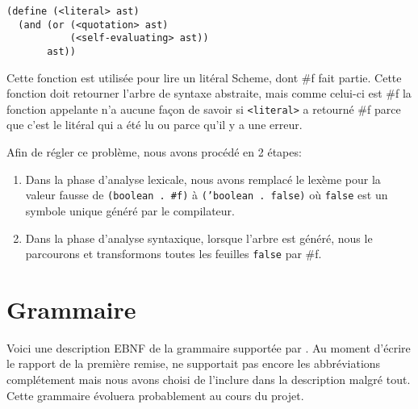\documentclass[11pt]{report}
\begin{document}
\begin{verbatim}
(define (<literal> ast)
  (and (or (<quotation> ast)
           (<self-evaluating> ast))
       ast))
\end{verbatim}

Cette fonction est utilisée pour lire un litéral Scheme, dont \#f fait
partie.  Cette fonction doit retourner l'arbre de syntaxe abstraite,
mais comme celui-ci est \#f la fonction appelante n'a aucune façon de
savoir si {\tt <literal>} a retourné \#f parce que c'est le litéral
qui a été lu ou parce qu'il y a une erreur.

Afin de régler ce problème, nous avons procédé en 2 étapes:

\begin{enumerate}
\item Dans la phase d'analyse lexicale, nous avons remplacé le lexème
  pour la valeur fausse de {\tt (boolean . #f)} à {\tt ('boolean .
    false)} où {\tt false} est un symbole unique généré par le
  compilateur.
\item Dans la phase d'analyse syntaxique, lorsque l'arbre est généré,
  nous le parcourons et transformons toutes les feuilles {\tt false}
  par \#f.
\end{enumerate}



\appendix
\chapter{Grammaire}
\label{grammaire}
Voici une description EBNF de la grammaire supportée par \sins{}. Au
moment d'écrire le rapport de la première remise, \sins{} ne
supportait pas encore les abbréviations complétement mais nous avons
choisi de l'inclure dans la description malgré tout. Cette grammaire
évoluera probablement au cours du projet.

\setlength{\grammarindent}{3em}
\end{document}
